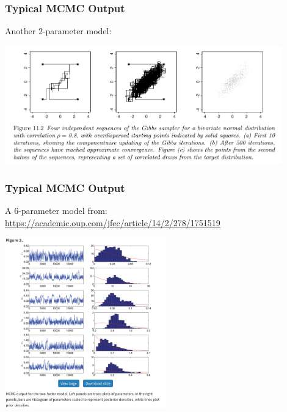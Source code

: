 \documentclass{beamer}
\begin{document}
\begin{frame}
\frametitle{Typical MCMC Output}

Another 2-parameter model:

\begin{center}
\includegraphics[width=120mm]{gibbs.png}
\end{center}

\end{frame}




\begin{frame}
\frametitle{Typical MCMC Output}

A 6-parameter model from: \url{https://academic.oup.com/jfec/article/14/2/278/1751519}

\begin{center}
\includegraphics[width=70mm]{trace_hist.png}
\end{center}

\end{frame}
\end{document}
